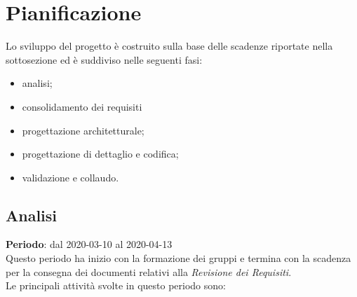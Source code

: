 \section{Pianificazione}
Lo sviluppo del progetto è costruito sulla base delle scadenze riportate nella sottosezione  ed è suddiviso nelle seguenti fasi:
\begin{itemize}
	\item analisi;
	\item consolidamento dei requisiti
	\item progettazione architetturale;
	\item progettazione di dettaglio e codifica;
	\item validazione e collaudo.
\end{itemize}

\subsection{Analisi}
\textbf{Periodo}: dal 2020-03-10 al 2020-04-13 \\
Questo periodo ha inizio con la formazione dei gruppi e termina con la scadenza per la consegna dei documenti relativi alla \textit{Revisione dei Requisiti}. \\
Le principali attività svolte in questo periodo sono:
